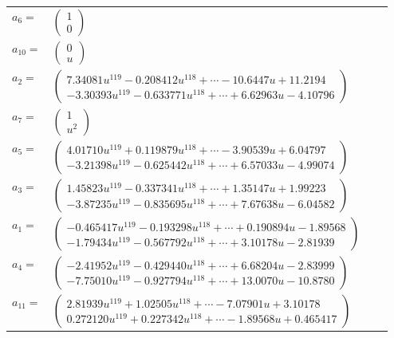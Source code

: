 \documentclass[1p]{elsarticle_modified}
\theoremstyle{definition}
\begin{document}
\begin{tabular}{m{7pt} m{180pt} m{7pt} m{180pt} }
\flushright $a_{6}=$&$\begin{pmatrix}1\\0\end{pmatrix}$ \\
\flushright $a_{10}=$&$\begin{pmatrix}0\\u\end{pmatrix}$ \\
\flushright $a_{2}=$&$\begin{pmatrix}7.34081 u^{119}-0.208412 u^{118}+\cdots-10.6447 u+11.2194\\-3.30393 u^{119}-0.633771 u^{118}+\cdots+6.62963 u-4.10796\end{pmatrix}$ \\
\flushright $a_{7}=$&$\begin{pmatrix}1\\u^2\end{pmatrix}$ \\
\flushright $a_{5}=$&$\begin{pmatrix}4.01710 u^{119}+0.119879 u^{118}+\cdots-3.90539 u+6.04797\\-3.21398 u^{119}-0.625442 u^{118}+\cdots+6.57033 u-4.99074\end{pmatrix}$ \\
\flushright $a_{3}=$&$\begin{pmatrix}1.45823 u^{119}-0.337341 u^{118}+\cdots+1.35147 u+1.99223\\-3.87235 u^{119}-0.835695 u^{118}+\cdots+7.67638 u-6.04582\end{pmatrix}$ \\
\flushright $a_{1}=$&$\begin{pmatrix}-0.465417 u^{119}-0.193298 u^{118}+\cdots+0.190894 u-1.89568\\-1.79434 u^{119}-0.567792 u^{118}+\cdots+3.10178 u-2.81939\end{pmatrix}$ \\
\flushright $a_{4}=$&$\begin{pmatrix}-2.41952 u^{119}-0.429440 u^{118}+\cdots+6.68204 u-2.83999\\-7.75010 u^{119}-0.927794 u^{118}+\cdots+13.0070 u-10.8780\end{pmatrix}$ \\
\flushright $a_{11}=$&$\begin{pmatrix}2.81939 u^{119}+1.02505 u^{118}+\cdots-7.07901 u+3.10178\\0.272120 u^{119}+0.227342 u^{118}+\cdots-1.89568 u+0.465417\end{pmatrix}$ \\

\end{tabular}
\end{document}

